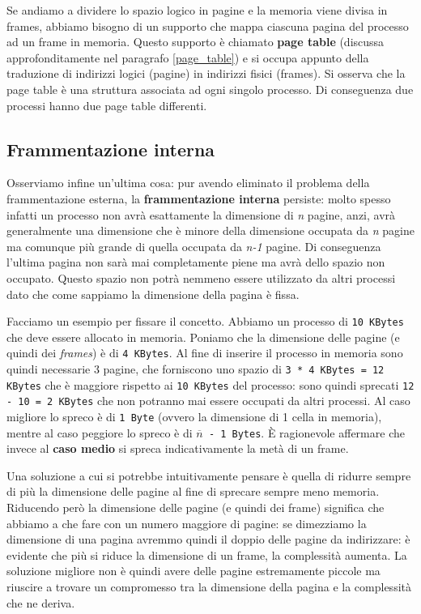 Se andiamo a dividere lo spazio logico in pagine e la memoria viene divisa in frames, abbiamo bisogno di un supporto che mappa ciascuna pagina del processo ad un frame in memoria. Questo supporto è chiamato \textbf{page table} (discussa approfonditamente nel paragrafo \ref{page_table}) e si occupa appunto della traduzione di indirizzi logici (pagine) in indirizzi fisici (frames). Si osserva che la page table è una struttura associata ad ogni singolo processo. Di conseguenza due processi hanno due page table differenti.

% 
\subsection{Frammentazione interna}
Osserviamo infine un'ultima cosa: pur avendo eliminato il problema della frammentazione esterna, la \textbf{frammentazione interna} persiste: molto spesso infatti un processo non avrà esattamente la dimensione di \textit{n} pagine, anzi, avrà generalmente una dimensione che è minore della dimensione occupata da \textit{n} pagine ma comunque più grande di quella occupata da \textit{n-1} pagine. Di conseguenza l'ultima pagina non sarà mai completamente piene ma avrà dello spazio non occupato. Questo spazio non potrà nemmeno essere utilizzato da altri processi dato che come sappiamo la dimensione della pagina è fissa.

Facciamo un esempio per fissare il concetto. Abbiamo un processo di \texttt{10 KBytes} che deve essere allocato in memoria. Poniamo che la dimensione delle pagine (e quindi dei \textit{frames}) è di \texttt{4 KBytes}. Al fine di inserire il processo in memoria sono quindi necessarie 3 pagine, che forniscono uno spazio di \texttt{3 * 4 KBytes = 12 KBytes} che è maggiore rispetto ai \texttt{10 KBytes} del processo: sono quindi sprecati \texttt{12 - 10 = 2 KBytes} che non potranno mai essere occupati da altri processi. Al caso migliore lo spreco è di \texttt{1 Byte} (ovvero la dimensione di 1 cella in memoria), mentre al caso peggiore lo spreco è di \texttt{$\overline{n}$ - 1 Bytes}. È ragionevole affermare che invece al \textbf{caso medio} si spreca indicativamente la metà di un frame.

Una soluzione a cui si potrebbe intuitivamente pensare è quella di ridurre sempre di più la dimensione delle pagine al fine di sprecare sempre meno memoria. Riducendo però la dimensione delle pagine (e quindi dei frame) significa che abbiamo a che fare con un numero maggiore di pagine: se dimezziamo la dimensione di una pagina avremmo quindi il doppio delle pagine da indirizzare: è evidente che più si riduce la dimensione di un frame, la complessità aumenta. La soluzione migliore non è quindi avere delle pagine estremamente piccole ma riuscire a trovare un compromesso tra la dimensione della pagina e la complessità che ne deriva.

